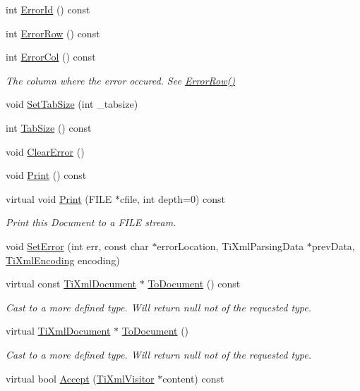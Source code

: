 \begin{DoxyCompactItemize}
int \hyperlink{class_ti_xml_document_af96fc2f3f9ec6422782bfe916c9e778f}{Error\+Id} () const 
\item 
int \hyperlink{class_ti_xml_document_af30efc75e804aa2e92fb8be3a8cb676e}{Error\+Row} () const 
\item 
int \hyperlink{class_ti_xml_document_aa90bc630ee5203c6109ca5fad3323649}{Error\+Col} () const 
\begin{DoxyCompactList}\small\item\em The column where the error occured. See \hyperlink{class_ti_xml_document_af30efc75e804aa2e92fb8be3a8cb676e}{Error\+Row()} \end{DoxyCompactList}\item 
void \hyperlink{class_ti_xml_document_a51dac56316f89b35bdb7d0d433ba988e}{Set\+Tab\+Size} (int \+\_\+tabsize)
\item 
int \hyperlink{class_ti_xml_document_a612360241b85bad0826b2a9ae9cda561}{Tab\+Size} () const 
\item 
void \hyperlink{class_ti_xml_document_ac66b8c28db86363315712a3574e87c35}{Clear\+Error} ()
\item 
void \hyperlink{class_ti_xml_document_af08389ec70ee9b2de7f800e206a18510}{Print} () const 
\item 
virtual void \hyperlink{class_ti_xml_document_a7b1aea204fee266b70b9c105c8bf2ada}{Print} (F\+I\+LE $\ast$cfile, int depth=0) const 
\begin{DoxyCompactList}\small\item\em Print this Document to a F\+I\+LE stream. \end{DoxyCompactList}\item 
void \hyperlink{class_ti_xml_document_a735c23e318597b920c94eae77fa206de}{Set\+Error} (int err, const char $\ast$error\+Location, Ti\+Xml\+Parsing\+Data $\ast$prev\+Data, \hyperlink{tinyxml_8h_a88d51847a13ee0f4b4d320d03d2c4d96}{Ti\+Xml\+Encoding} encoding)
\item 
virtual const \hyperlink{class_ti_xml_document}{Ti\+Xml\+Document} $\ast$ \hyperlink{class_ti_xml_document_a1dc977bde3e4fe85a8eb9d88a35ef5a4}{To\+Document} () const 
\begin{DoxyCompactList}\small\item\em Cast to a more defined type. Will return null not of the requested type. \end{DoxyCompactList}\item 
virtual \hyperlink{class_ti_xml_document}{Ti\+Xml\+Document} $\ast$ \hyperlink{class_ti_xml_document_a1025d942a1f328fd742d545e37efdd42}{To\+Document} ()
\begin{DoxyCompactList}\small\item\em Cast to a more defined type. Will return null not of the requested type. \end{DoxyCompactList}\item 
virtual bool \hyperlink{class_ti_xml_document_a3daab2f472418ef66315750202f762ae}{Accept} (\hyperlink{class_ti_xml_visitor}{Ti\+Xml\+Visitor} $\ast$content) const 
\end{DoxyCompactItemize}
